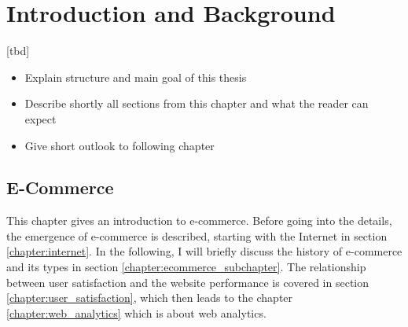 \chapter{Introduction and Background}

[tbd]

\begin{itemize}
	\item Explain structure and main goal of this thesis
	\item Describe shortly all sections from this chapter and what the reader can expect
	\item Give short outlook to following chapter
\end{itemize}












\section{E-Commerce}
\label{chapter:e-commerce}

This chapter gives an introduction to e-commerce.
Before going into the details, the emergence of e-commerce is described, starting with the Internet in section \ref{chapter:internet}.
In the following, I will briefly discuss the history of e-commerce and its types in section \ref{chapter:ecommerce_subchapter}.
The relationship between user satisfaction and the website performance is covered in section \ref{chapter:user_satisfaction}, which then leads to the chapter \ref{chapter:web_analytics} which is about web analytics.



